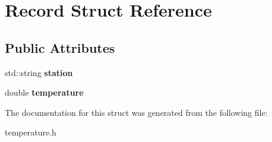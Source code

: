 \hypertarget{structRecord}{}\section{Record Struct Reference}
\label{structRecord}
\subsection*{Public Attributes}
\begin{DoxyCompactItemize}
\item 
std\+::string {\bfseries station}\hypertarget{structRecord_a594772e9772b63fa5897512bc618bf58}{}\label{structRecord_a594772e9772b63fa5897512bc618bf58}

\item 
double {\bfseries temperature}\hypertarget{structRecord_a04ffa52863d86812a456d566b10266e1}{}\label{structRecord_a04ffa52863d86812a456d566b10266e1}

\end{DoxyCompactItemize}


The documentation for this struct was generated from the following file\+:\begin{DoxyCompactItemize}
\item 
temperature.\+h\end{DoxyCompactItemize}
